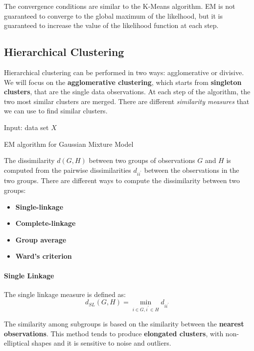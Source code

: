 The convergence conditions are similar to the K-Means algorithm. EM is not guaranteed to converge to the global maximum of the likelhood, but it is guaranteed to increase the value of the likelihood function at each step.

\subsection*{Hierarchical Clustering}
Hierarchical clustering can be performed in two ways: agglomerative or divisive.
We will focus on the \textbf{agglomerative clustering}, which starts from \textbf{singleton clusters}, that are the single data observations. At each step of the algorithm, the two most similar clusters are merged. There are different \textit{similarity measures} that we can use to find similar clusters.

\begin{algorithm}
    \SetAlgoLined
    Input: data set $X$ \\
    \caption{EM algorithm for Gaussian Mixture Model}
\end{algorithm}

The dissimilarity $d(G,H)$ between two groups of observations $G$ and $H$ is computed from the pairwise dissimilarities $d_{ii^{\prime}}$ between the observations in the two groups. There are different ways to compute the dissimilarity between two groups:
\begin{itemize}
    \item \textbf{Single-linkage}
    \item \textbf{Complete-linkage}
    \item \textbf{Group average}
    \item \textbf{Ward's criterion}
\end{itemize}

\paragraph*{Single Linkage}
The single linkage measure is defined as:
\[
    d_{SL}(G,H) = \min_{i \in G, i^{\prime} \in H} d_{ii^{\prime}}
\]

The similarity among subgroups is based on the similarity between the \textbf{nearest observations}. This method tends to produce \textbf{elongated clusters}, with non-elliptical shapes and it is sensitive to noise and outliers.


